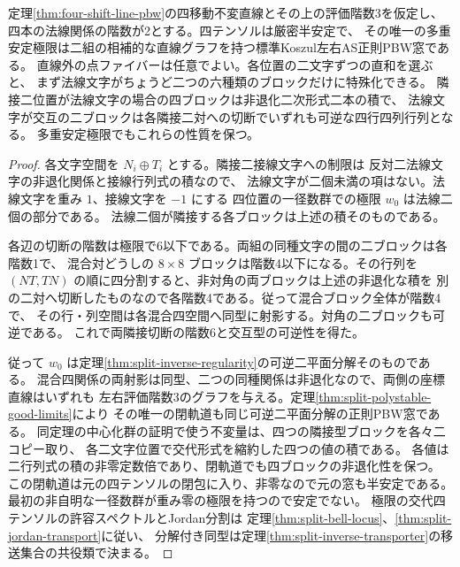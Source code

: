 \begin{theorem}\label{thm:line-polystable-regular-limit}
定理\ref{thm:four-shift-line-pbw}の四移動不変直線とその上の評価階数3を仮定し、
四本の法線関係の階数が2とする。四テンソルは厳密半安定で、
その唯一の多重安定極限は二組の相補的な直線グラフを持つ標準Koszul左右AS正則PBW窓である。
直線外の点ファイバーは任意でよい。各位置の二文字ずつの直和を選ぶと、
まず法線文字がちょうど二つの六種類のブロックだけに特殊化できる。
隣接二位置が法線文字の場合の四ブロックは非退化二次形式二本の積で、
法線文字が交互の二ブロックは各隣接二対への切断でいずれも可逆な四行四列行列となる。
多重安定極限でもこれらの性質を保つ。
\end{theorem}
\begin{proof}
各文字空間を $N_i\oplus T_i$ とする。隣接二接線文字への制限は
反対二法線文字の非退化関係と接線行列式の積なので、
法線文字が二個未満の項はない。法線文字を重み $1$、接線文字を $-1$ にする
四位置の一径数群での極限 $w_0$ は法線二個の部分である。
法線二個が隣接する各ブロックは上述の積そのものである。

各辺の切断の階数は極限で6以下である。両組の同種文字の間の二ブロックは各階数1で、
混合対どうしの $8\times8$ ブロックは階数4以下になる。その行列を
$(NT,TN)$ の順に四分割すると、非対角の両ブロックは上述の非退化な積を
別の二対へ切断したものなので各階数4である。従って混合ブロック全体が階数4で、
その行・列空間は各混合四空間へ同型に射影する。対角の二ブロックも可逆である。
これで両隣接切断の階数6と交互型の可逆性を得た。

従って $w_0$ は定理\ref{thm:split-inverse-regularity}の可逆二平面分解そのものである。
混合四関係の両射影は同型、二つの同種関係は非退化なので、両側の座標直線はいずれも
左右評価階数3のグラフを与える。定理\ref{thm:split-polystable-good-limits}により
その唯一の閉軌道も同じ可逆二平面分解の正則PBW窓である。
同定理の中心化群の証明で使う不変量は、四つの隣接型ブロックを各々二コピー取り、
各二文字位置で交代形式を縮約した四つの値の積である。
各値は二行列式の積の非零定数倍であり、閉軌道でも四ブロックの非退化性を保つ。
この閉軌道は元の四テンソルの閉包に入り、非零なので元の窓も半安定である。
最初の非自明な一径数群が重み零の極限を持つので安定でない。
極限の交代四テンソルの許容スペクトルとJordan分割は
定理\ref{thm:split-bell-locus}、\ref{thm:split-jordan-transport}に従い、
分解付き同型は定理\ref{thm:split-inverse-transporter}の移送集合の共役類で決まる。
\end{proof}

